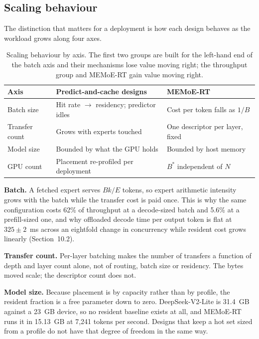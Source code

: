 \subsection{Scaling behaviour}

The distinction that matters for a deployment is how each design behaves as the
workload grows along four axes.

\begin{table}[htbp]
\centering\small
\caption{Scaling behaviour by axis. The first two groups are built for the
left-hand end of the batch axis and their mechanisms lose value moving right; the
throughput group and MEMoE-RT gain value moving right.}
\label{tab:scaling}
\begin{tabular}{lll}
\toprule
Axis & Predict-and-cache designs & MEMoE-RT \\
\midrule
Batch size & Hit rate $\to$ residency; predictor idles & Cost per token falls as $1/B$ \\
Transfer count & Grows with experts touched & One descriptor per layer, fixed \\
Model size & Bounded by what the GPU holds & Bounded by host memory \\
GPU count & Placement re-profiled per deployment & $B^{*}$ independent of $N$ \\
\bottomrule
\end{tabular}
\end{table}

\textbf{Batch.} A fetched expert serves $Bk/E$ tokens, so expert arithmetic
intensity grows with the batch while the transfer cost is paid once. This is why
the same configuration costs 62\% of throughput at a decode-sized batch and 5.6\%
at a prefill-sized one, and why offloaded decode time per output token is flat at
$325 \pm 2$~ms across an eightfold change in concurrency while resident cost grows
linearly (Section~10.2).

\textbf{Transfer count.} Per-layer batching makes the number of transfers a
function of depth and layer count alone, not of routing, batch size or residency.
The bytes moved scale; the descriptor count does not.

\textbf{Model size.} Because placement is by capacity rather than by profile, the
resident fraction is a free parameter down to zero. DeepSeek-V2-Lite is 31.4~GB
against a 23~GB device, so no resident baseline exists at all, and MEMoE-RT runs
it in 15.13~GB at 7{,}241 tokens per second. Designs that keep a hot set sized
from a profile do not have that degree of freedom in the same way.

